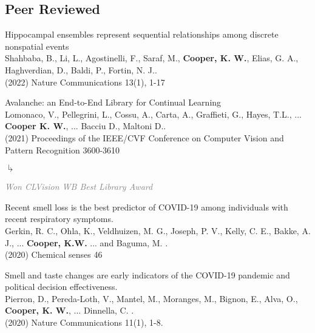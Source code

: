 \documentclass[10pt]{cooperCV2}
\begin{document}
\subsection{Peer Reviewed} 
% 
\begin{etaremune}[resume,itemindent=-1.5\bibhang, topsep=0pt,
				   itemsep=\bibsep,partopsep=0pt,parsep=0pt,leftmargin={\bibhang+\widthof{[999]}}] 
    
    \item Hippocampal ensembles represent sequential relationships among discrete nonspatial events \\
     Shahbaba, B., Li, L., Agostinelli, F., Saraf, M., \textbf{Cooper, K. W.}, Elias, G. A., Haghverdian, D., Baldi, P.,  Fortin, N. J.. \\ (2022) Nature Communications 13(1), 1-17
     
	
    \item Avalanche: an End-to-End Library for Continual Learning \\
     Lomonaco, V., Pellegrini, L., Cossu, A., Carta, A., Graffieti, G., Hayes, T.L., ... \textbf{Cooper K. W.}, ... Bacciu D., Maltoni D.. \\ (2021) Proceedings of the IEEE/CVF Conference on Computer Vision and Pattern Recognition 3600-3610
     
     	\begin{list}{$\drsh$}{}
     	
	      \item \textcolor{grey}{\textit{Won CLVision WB Best Library Award} }
     	
     	\end{list} 
     
	
    \item Recent smell loss is the best predictor of COVID-19 among individuals with recent respiratory symptoms. \\
     Gerkin, R. C., Ohla, K., Veldhuizen, M. G., Joseph, P. V., Kelly, C. E., Bakke, A. J., ... \textbf{Cooper, K.W.} ... and Baguma, M. . \\ (2020) Chemical senses 46
     
	
    \item Smell and taste changes are early indicators of the COVID-19 pandemic and political decision effectiveness. \\
     Pierron, D., Pereda-Loth, V., Mantel, M., Moranges, M., Bignon, E., Alva, O.,  \textbf{Cooper, K. W.}, ... Dinnella, C. . \\ (2020) Nature Communications 11(1), 1-8.
     

\end{etaremune}
\end{document}
